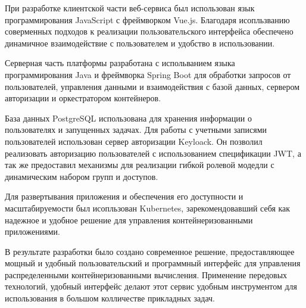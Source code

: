 При разработке клиентской части веб-сервиса был использован язык программирования JavaScript с фреймворком Vue.js.  Благодаря исопльзванию соверменных подходов к реализации пользовательского интерфейса обеспечено динамичное взаимодействие с пользователем и удобство в использовании.

Серверная часть платформы разработана с испольванием языка программирования Java и фреймворка Spring Boot для обработки запросов от пользователей, управления данными и взаимодействия с базой данных, сервером авторизации и оркестратором контейнеров.

База данных PostgreSQL использована для хранения информации о пользователях и запущенных задачах. Для работы с учетными записями пользователей использован сервер авторизации Keyloack. Он позволил реализовать авторизацию пользователей с использованием спецификации JWT, а так же предоставил механизмы для реализации гибкой ролевой модедли с динамическим набором групп и доступов.

Для развертывания приложения и обеспечения его доступности и масштабируемости был исопльзован Kubernetes, зарекомендовавший себя как надежное и удобное решение для управления контейнеризованными приложениями.

В результате разработки было создано современное решение, предоставляющее мощный и удобный пользовательский и программный интерфейс для управления распределенными контейнеризованными вычисления. Применение передовых технологий, удобный интерфейс делают этот сервис удобным инструментом для использования в большом колличестве прикладных задач.